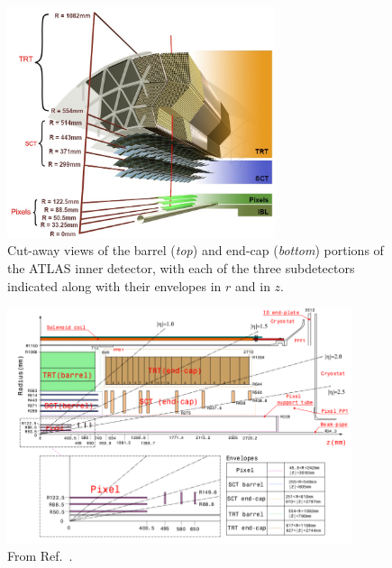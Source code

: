 \begin{figure}[!htb]
    \begin{center}
        \includegraphics[width=0.7\textwidth]{figures/chapter2/inner_detector/atlas_ID_barrel_exploded}
        \caption{
            Cut-away views of the barrel (\textit{top}) and end-cap (\textit{bottom}) portions
            of the ATLAS inner detector, with each of the three subdetectors indicated along with their
            envelopes in $r$ and in $z$.
        }
        \label{fig:atlas_ID_exploded}
    \end{center}
\end{figure}

\begin{figure}[!htb]
    \begin{center}
        \includegraphics[width=0.9\textwidth]{figures/chapter2/inner_detector/atlas_ID_plan_view}
        \caption{
            From Ref.~\cite{ATLASCollab}.
        }
        \label{fig:atlas_ID_plan_view}
    \end{center}
\end{figure}

